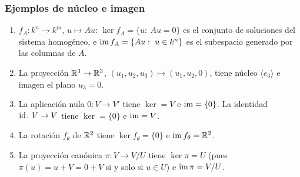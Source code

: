 \begin{frame}
    \frametitle{Ejemplos de núcleo e imagen}

    \begin{example}
        \begin{enumerate}
            \item $f_A\colon k^n\to k^m$, $u\mapsto Au$:
            $\ker f_A=\{u:\ Au=0\}$ es el conjunto de soluciones del
            sistema homogéneo, e $\operatorname{im} f_A=\{Au:\ u\in k^n\}$ es el
            subespacio generado por las columnas de $A$.
            \item La proyección $\mathbb{R}^3\rightarrow\mathbb{R}^3$, $(u_1,u_2,u_3)\mapsto(u_1,u_2,0)$,
            tiene núcleo $\langle e_3\rangle$ e imagen el plano
            $u_3=0$.
            \item La aplicación nula $0\colon V\to V'$ tiene $\ker=V$ e $\operatorname{im}=\{0\}$. La
            identidad $\operatorname{id}\colon V\to V$ tiene $\ker=\{0\}$ e $\operatorname{im}=V$.
            \item La rotación $f_\theta$ de $\mathbb{R}^2$ tiene $\ker f_\theta=\{0\}$
            e $\operatorname{im} f_\theta=\mathbb{R}^2$.
            \item La proyección canónica $\pi\colon V\to V/U$ tiene
            $\ker\pi=U$ (pues $\pi(u)=u+V=0+V$ si y solo si
            $u\in U$) e $\operatorname{im}\pi=V/U$.
        \end{enumerate}
    \end{example}
\end{frame}


